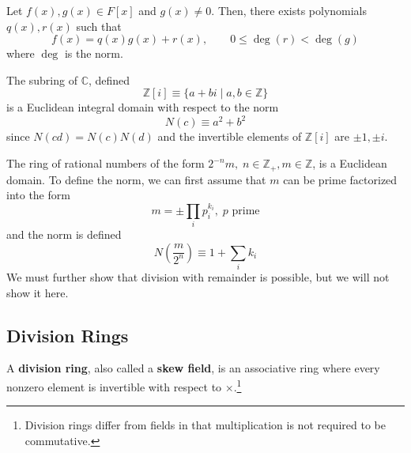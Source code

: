   \begin{theorem}
    Let $f(x), g(x) \in F[x]$ and $g(x) \neq 0$. Then, there exists polynomials $q(x), r(x)$ such that 
    \begin{equation}
      f(x) = q(x) g(x) + r(x), \qquad 0 \leq \deg(r) < \deg(g)
    \end{equation}
    where $\deg$ is the norm.
  \end{theorem}

  \begin{example}
    The subring of $\mathbb{C}$, defined
    \begin{equation}
      \mathbb{Z}[i] \equiv \{ a + b i \mid a, b \in \mathbb{Z} \}
    \end{equation}
    is a Euclidean integral domain with respect to the norm 
    \begin{equation}
      N(c) \equiv a^2 + b^2
    \end{equation}
    since $N(c d) = N(c) N(d)$ and the invertible elements of $\mathbb{Z}[i]$ are $\pm 1, \pm i$. 
  \end{example}

  \begin{example}
    The ring of rational numbers of the form $2^{-n} m, \; n \in \mathbb{Z}_+, m \in \mathbb{Z}$, is a Euclidean domain. To define the norm, we can first assume that $m$ can be prime factorized into the form 
    \begin{equation}
      m = \pm \prod_{i} p_{i}^{k_i}, \; p \text{ prime}
    \end{equation}
    and the norm is defined 
    \begin{equation}
      N(\frac{m}{2^n}) \equiv 1 + \sum_i k_i
    \end{equation}
    We must further show that division with remainder is possible, but we will not show it here. 
  \end{example}

\subsection{Division Rings}

  \begin{definition}
    A \textbf{division ring}, also called a \textbf{skew field}, is an associative ring where every nonzero element is invertible with respect to $\times$.\footnote{Division rings differ from fields in that multiplication is not required to be commutative. }
  \end{definition}

